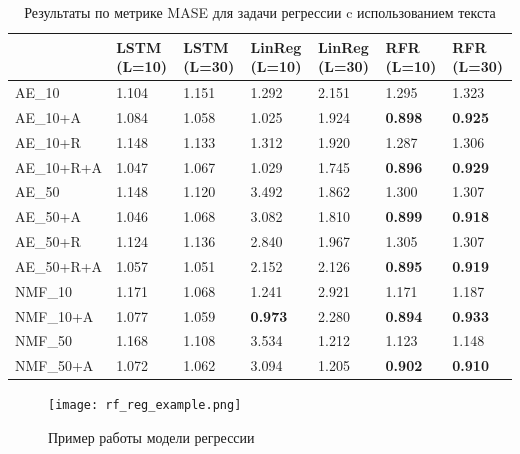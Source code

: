 \begin{center}
\begin{table}
 \begin{tabular}{||p{3.8cm}|p{1.5cm}|p{1.5cm}|p{1.5cm}|p{1.5cm}|p{1.5cm}|p{1.5cm}||} 
\hline
& LSTM (L=10) & LSTM (L=30) & LinReg (L=10) & LinReg (L=30) & RFR (L=10) & RFR (L=30)\\ \hline\hline
AE\_10 & 1.104 & 1.151 & 1.292 & 2.151 & 1.295 & 1.323\\ \hline
AE\_10+A & 1.084 & 1.058 & 1.025 & 1.924 & \textbf{0.898} & \textbf{0.925}\\ \hline
AE\_10+R & 1.148 & 1.133 & 1.312 & 1.920 & 1.287 & 1.306\\ \hline
AE\_10+R+A & 1.047 & 1.067 & 1.029 & 1.745 & \textbf{0.896} & \textbf{0.929}\\ \hline
AE\_50 & 1.148 & 1.120 & 3.492 & 1.862 & 1.300 & 1.307\\ \hline
AE\_50+A & 1.046 & 1.068 & 3.082 & 1.810 & \textbf{0.899} & \textbf{0.918}\\ \hline
AE\_50+R & 1.124 & 1.136 & 2.840 & 1.967 & 1.305 & 1.307\\ \hline
AE\_50+R+A & 1.057 & 1.051 & 2.152 & 2.126 & \textbf{0.895} & \textbf{0.919}\\ \hline
NMF\_10 & 1.171 & 1.068 & 1.241 & 2.921 & 1.171 & 1.187\\ \hline
NMF\_10+A & 1.077 & 1.059 & \textbf{0.973} & 2.280 & \textbf{0.894} & \textbf{0.933}\\ \hline
NMF\_50 & 1.168 & 1.108 & 3.534 & 1.212 & 1.123 & 1.148\\ \hline
NMF\_50+A & 1.072 & 1.062 & 3.094 & 1.205 & \textbf{0.902} & \textbf{0.910}\\ \hline
\end{tabular}
\caption{\label{tab:reg-res} Результаты по метрике MASE для задачи регрессии c использованием текста}
\end{table}
\end{center}




\begin{figure}
  \texttt{[image: rf\_reg\_example.png]}
  \caption{Пример работы модели регрессии}
  \label{fig:rf_reg_example}
\end{figure}

